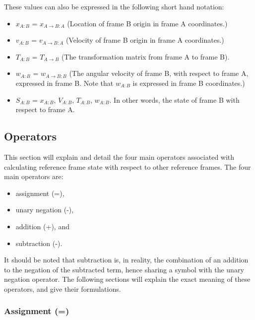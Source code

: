 These values can also be expressed in the following short hand notation:

\begin{itemize}
\item{$x_{A:B}$}     = $x_{A \rightarrow B:A}$ (Location of frame B
                                     origin in frame A coordinates.)
\item{$v_{A:B}$}     = $v_{A \rightarrow B:A}$ (Velocity of frame B origin in frame A
                                     coordinates.)
\item{$T_{A:B}$}     = $T_{A \rightarrow B}$ (The transformation matrix from frame A to
                                   frame B).
\item{$w_{A:B}$}     = $w_{A \rightarrow B:B}$ (The angular velocity of frame B, with
respect to frame A, expressed in frame B. Note that $w_{A:B}$ is
expressed in frame B coordinates.)

\item{$S_{A:B}$}     = {$x_{A:B}$, $V_{A:B}$, $T_{A:B}$, $w_{A:B}$}.
In other words, the state of frame B with respect to frame A.
\end{itemize}

\subsection{Operators}

This section will explain and detail the four main operators associated with
calculating reference frame state with respect to other reference frames. The
four main operators are:

\begin{itemize}
\item{assignment (=)},
\item{unary negation (-)},
\item{addition (+)}, and
\item{subtraction (-)}.
\end{itemize}

It should be noted that subtraction is, in reality, the combination of an addition
to the negation of the subtracted term, hence sharing a symbol with the
unary negation operator. The following sections will explain
the exact meaning of these operators, and give their formulations.

\subsubsection{Assignment (=)}

